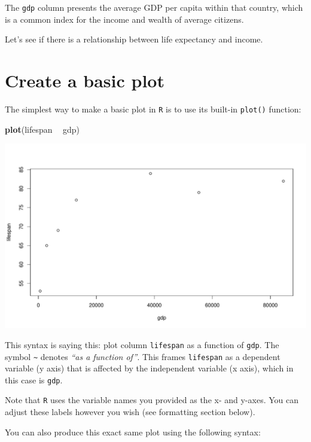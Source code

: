 \documentclass[
]{book}
\newenvironment{Shaded}{\begin{snugshade}}{\end{snugshade}}
\newcommand{\KeywordTok}[1]{\textcolor[rgb]{0.13,0.29,0.53}{\textbf{#1}}}
\newcommand{\NormalTok}[1]{#1}
\newcommand{\OperatorTok}[1]{\textcolor[rgb]{0.81,0.36,0.00}{\textbf{#1}}}
\newcommand{\StringTok}[1]{\textcolor[rgb]{0.31,0.60,0.02}{#1}}
\begin{document}
The \texttt{gdp} column presents the average GDP per capita within that country, which is a common index for the income and wealth of average citizens.

Let's see if there is a relationship between life expectancy and income.

\hypertarget{create-a-basic-plot}{%
\section*{Create a basic plot}\label{create-a-basic-plot}}

The simplest way to make a basic plot in \texttt{R} is to use its built-in \texttt{plot()} function:

\begin{Shaded}
\begin{Highlighting}[]
\KeywordTok{plot}\NormalTok{(lifespan }\OperatorTok{~}\StringTok{ }\NormalTok{gdp)}
\end{Highlighting}
\end{Shaded}

\includegraphics{figures/unnamed-chunk-98-1.pdf}

This syntax is saying this: plot column \texttt{lifespan} as a function of \texttt{gdp}. The symbol \texttt{\textasciitilde{}} denotes \emph{``as a function of''}. This frames \texttt{lifespan} as a dependent variable (y axis) that is affected by the independent variable (x axis), which in this case is \texttt{gdp}.

Note that \texttt{R} uses the variable names you provided as the x- and y-axes. You can adjust these labels however you wish (see formatting section below).

You can also produce this exact same plot using the following syntax:
\end{document}
